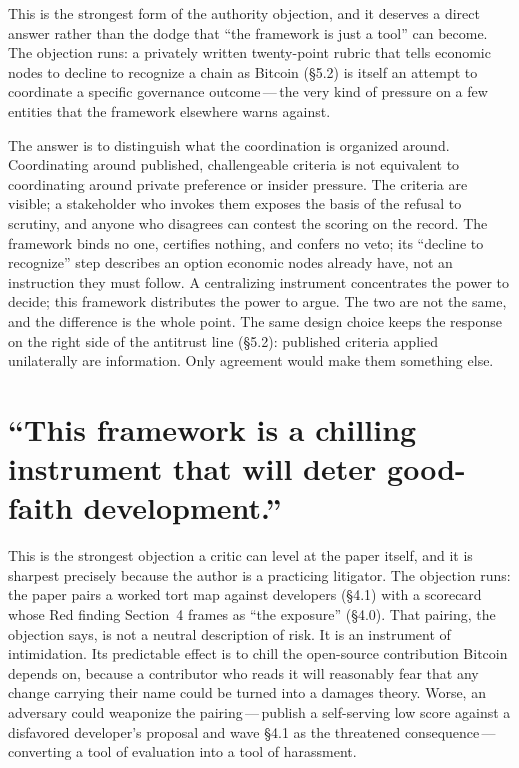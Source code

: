 \documentclass[11pt, twoside, openright]{book}
\newcommand{\sect}[1]{\S#1}
\begin{document}
This is the strongest form of the authority objection, and it deserves a direct answer rather than the dodge that ``the framework is just a tool'' can become. The objection runs: a privately written twenty-point rubric that tells economic nodes to decline to recognize a chain as Bitcoin (\sect{5.2}) is itself an attempt to coordinate a specific governance outcome\,---\,the very kind of pressure on a few entities that the framework elsewhere warns against.

The answer is to distinguish what the coordination is organized around. Coordinating around published, challengeable criteria is not equivalent to coordinating around private preference or insider pressure. The criteria are visible; a stakeholder who invokes them exposes the basis of the refusal to scrutiny, and anyone who disagrees can contest the scoring on the record. The framework binds no one, certifies nothing, and confers no veto; its ``decline to recognize'' step describes an option economic nodes already have, not an instruction they must follow. A centralizing instrument concentrates the power to decide; this framework distributes the power to argue. The two are not the same, and the difference is the whole point. The same design choice keeps the response on the right side of the antitrust line (\sect{5.2}): published criteria applied unilaterally are information. Only agreement would make them something else.

\section{\texorpdfstring{``This framework is a chilling instrument that will deter good-faith development.''}{\textquotedblleft This framework is a chilling instrument that will deter good-faith development.\textquotedblright}}

This is the strongest objection a critic can level at the paper itself, and it is sharpest precisely because the author is a practicing litigator. The objection runs: the paper pairs a worked tort map against developers (\sect{4.1}) with a scorecard whose Red finding Section~4 frames as ``the exposure'' (\sect{4.0}). That pairing, the objection says, is not a neutral description of risk. It is an instrument of intimidation. Its predictable effect is to chill the open-source contribution Bitcoin depends on, because a contributor who reads it will reasonably fear that any change carrying their name could be turned into a damages theory. Worse, an adversary could weaponize the pairing\,---\,publish a self-serving low score against a disfavored developer's proposal and wave \sect{4.1} as the threatened consequence\,---\,converting a tool of evaluation into a tool of harassment.
\end{document}
